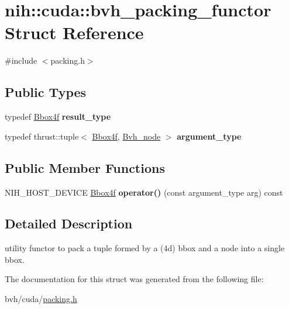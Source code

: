 \hypertarget{structnih_1_1cuda_1_1bvh__packing__functor}{
\section{nih\-:\-:cuda\-:\-:bvh\-\_\-packing\-\_\-functor \-Struct \-Reference}
\label{structnih_1_1cuda_1_1bvh__packing__functor}
}


{\ttfamily \#include $<$packing.\-h$>$}

\subsection*{\-Public \-Types}
\begin{DoxyCompactItemize}
\item 
\hypertarget{structnih_1_1cuda_1_1bvh__packing__functor_a6d857fd88aa68163eaf9239c8bc7512e}{
typedef \hyperlink{structnih_1_1_bbox}{\-Bbox4f} {\bfseries result\-\_\-type}}
\label{structnih_1_1cuda_1_1bvh__packing__functor_a6d857fd88aa68163eaf9239c8bc7512e}

\item 
\hypertarget{structnih_1_1cuda_1_1bvh__packing__functor_a58904fad03661b2124a49e3ee9c00e96}{
typedef thrust\-::tuple$<$ \hyperlink{structnih_1_1_bbox}{\-Bbox4f}, \*
\hyperlink{structnih_1_1_bvh__node}{\-Bvh\-\_\-node} $>$ {\bfseries argument\-\_\-type}}
\label{structnih_1_1cuda_1_1bvh__packing__functor_a58904fad03661b2124a49e3ee9c00e96}

\end{DoxyCompactItemize}
\subsection*{\-Public \-Member \-Functions}
\begin{DoxyCompactItemize}
\item 
\hypertarget{structnih_1_1cuda_1_1bvh__packing__functor_a9648db88afadee8682039c1d94fb8628}{
\-N\-I\-H\-\_\-\-H\-O\-S\-T\-\_\-\-D\-E\-V\-I\-C\-E \hyperlink{structnih_1_1_bbox}{\-Bbox4f} {\bfseries operator()} (const argument\-\_\-type arg) const }
\label{structnih_1_1cuda_1_1bvh__packing__functor_a9648db88afadee8682039c1d94fb8628}

\end{DoxyCompactItemize}


\subsection{\-Detailed \-Description}
utility functor to pack a tuple formed by a (4d) bbox and a node into a single bbox. 

\-The documentation for this struct was generated from the following file\-:\begin{DoxyCompactItemize}
\item 
bvh/cuda/\hyperlink{packing_8h}{packing.\-h}\end{DoxyCompactItemize}

